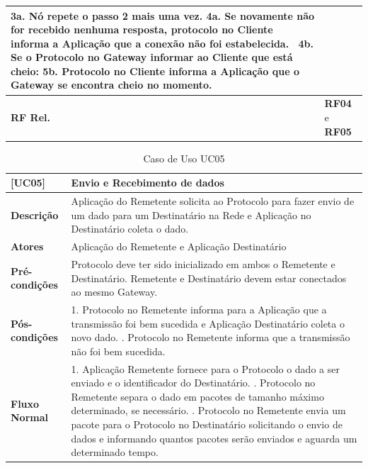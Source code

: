 \begin{longtable}{|p{2.65cm}|p{13cm}|}
    3a. Nó repete o passo 2 mais uma vez. \newline
    4a. Se novamente não for recebido nenhuma resposta, protocolo no Cliente informa a Aplicação
    que a conexão não foi estabelecida.
    \newline \newline \ 
    4b. Se o Protocolo no Gateway informar ao Cliente que está cheio: \newline
    5b. Protocolo no Cliente informa a Aplicação que o Gateway se encontra cheio no momento. \\
    \hline
    \textbf{RF Rel.} & \textbf{RF04} e \textbf{RF05} \\
    \hline
\end{longtable}

\begin{longtable}{|p{2.65cm}|p{13cm}|}
    \caption{Caso de Uso UC05}\label{tab:use-cases05} \\
    \hline
    \textbf{[UC05]} & Envio e Recebimento de dados \\
    \hline
    \textbf{Descrição} & Aplicação do Remetente solicita ao Protocolo para fazer envio de um dado para um Destinatário na Rede e Aplicação no Destinatário coleta o dado. \\
    \hline
    \textbf{Atores} & Aplicação do Remetente e Aplicação Destinatário \\
    \hline
    \textbf{Pré-condições} & Protocolo deve ter sido inicializado em ambos o Remetente e Destinatário. \newline
    Remetente e Destinatário devem estar conectados ao mesmo Gateway. \\
    \hline
    \textbf{Pós-condições} & 1. Protocolo no Remetente informa para a Aplicação que a transmissão foi bem sucedida e Aplicação Destinatário coleta o novo dado. \newline
    2. Protocolo no Remetente informa que a transmissão não foi bem sucedida. \\
    \hline
    \textbf{Fluxo Normal} & 1. Aplicação Remetente fornece para o Protocolo o dado a ser enviado e o identificador do Destinatário. \newline
    2. Protocolo no Remetente separa o dado em pacotes de tamanho máximo determinado, se necessário. \newline
    3. Protocolo no Remetente envia um pacote para o Protocolo no Destinatário solicitando o envio de dados e informando quantos pacotes serão enviados e aguarda um determinado tempo. \newline

\end{longtable}
